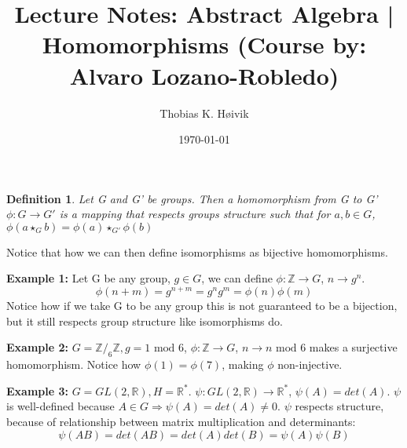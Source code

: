 \documentclass[12pt]{article}
\title{Lecture Notes: Abstract Algebra | Homomorphisms (Course by: Alvaro Lozano-Robledo)}
\author{Thobias K. Høivik}
\date{\today}
\newtheorem{definition}{Definition}
\begin{document}
\maketitle

\begin{definition}
    Let G and G' be groups. Then a homomorphism from G to G' \(\phi: G \to G'\) 
    is a mapping that respects groups structure such that 
    for \(a,b \in G \), \(\phi(a \star_G b) = \phi(a) \star_{G'} \phi(b)\)
\end{definition}

\noindent 
Notice that how we can then define isomorphisms as bijective homomorphisms.

\noindent 
\textbf{Example 1:}
Let G be any group, \(g\in G\), we can define \(\phi: \mathbb Z \to G\), \(n \to g^n\). 
\[ 
    \phi(n+m) = g^{n+m} = g^n g^m = \phi(n)\phi(m)
\]
Notice how if we take G to be any group this is not guaranteed to be a bijection, 
but it still respects group structure like isomorphisms do.

\noindent 
\textbf{Example 2:} 
\(G = \mathbb Z /_6 \mathbb Z, g = 1 \text{ mod } 6\), \(\phi: \mathbb Z \to G\), 
\(n \to n \text{ mod } 6\) makes a surjective homomorphism. 
Notice how \(\phi(1) = \phi(7)\), making \(\phi\) non-injective.

\noindent 
\textbf{Example 3:} 
\(G = GL(2, \mathbb R), H = \mathbb R^*\). 
\(\psi: GL(2, \mathbb R) \to \mathbb R^*\), \(\psi(A) = det(A)\). 
\(\psi\) is well-defined because \(A \in G \Rightarrow \psi(A) = det(A) \neq 0\). 
\(\psi\) respects structure, because of relationship between matrix multiplication and 
determinants: 
\[ 
    \psi(AB) = det(AB) = det(A)det(B) = \psi(A)\psi(B) 
\]
\end{document}
